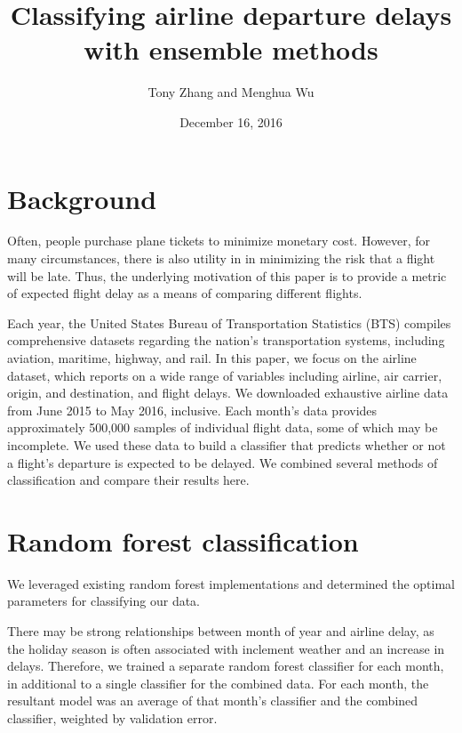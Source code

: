 \documentclass{article}
\title{Classifying airline departure delays with ensemble methods}
\author{Tony Zhang and Menghua Wu}
\date{December 16, 2016}
\begin{document}
\maketitle

\begin{multicols}{2}


\section{Background}
\label{sec:bg}

Often, people purchase plane tickets
to minimize monetary cost.
However, for many circumstances,
there is also utility in
in minimizing the risk that a flight will be late.
Thus, the underlying motivation of this paper
is to provide a metric of expected flight delay
as a means of comparing different flights.

Each year,
the United States Bureau of Transportation Statistics (BTS)
compiles comprehensive datasets
regarding the nation's transportation systems,
including aviation, maritime, highway, and rail.
In this paper, we focus on the airline dataset,
which reports on a wide range of variables including
airline, air carrier, origin, and destination, and flight delays.
We downloaded exhaustive airline data
from June 2015 to May 2016, inclusive.
Each month's data provides
approximately 500,000 samples of individual flight data,
some of which may be incomplete.
We used these data to build a classifier
that predicts whether or not a flight's departure
is expected to be delayed.
We combined several methods of classification
and compare their results here.

\section{Random forest classification}

We leveraged existing random forest implementations
and determined the optimal parameters for classifying our data.

There may be strong relationships between
month of year and airline delay,
as the holiday season is often associated with
inclement weather and an increase in delays.
Therefore, we trained a separate random forest classifier
for each month, in additional to a single classifier
for the combined data.
For each month,
the resultant model was an average of
that month's classifier and the combined classifier,
weighted by validation error.


\end{multicols}
\end{document}
